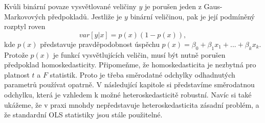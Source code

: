 Kvůli binární povaze vysvětlované veličiny $y$ je porušen jeden 
z Gaus-Markovových předpokladů. Jestliže je $y$ binární veličinou, 
pak je její podmíněný rozptyl roven
\begin{equation}
var[y|x] = p(x)\left(1 - p(x)\right),
\end{equation}
kde $p(x)$ představuje pravděpodobnost úspěchu $p(x) = \beta_0 + 
\beta_1 x_1 + ... + \beta_k x_k$. Protože $p(x)$ je funkcí 
vysvětlujících veličin, musí být nutně porušen předpoklad 
homoskedasticity. Připomeňme, že homoskedasticita je nezbytná pro 
platnost $t$ a $F$ statistik. Proto je třeba směrodatné 
odchylky odhadnutých parametrů používat opatrně. V následující kapitole
si představíme směrodatnou odchylku, která je vzhledem k možné 
heteroskedasticitě robustní. Navíc si také ukážeme, že v praxi 
mnohdy nepředstavuje heteroskedasticita zásadní problém, a že 
standardní OLS statistiky jsou stále použitelné. 
